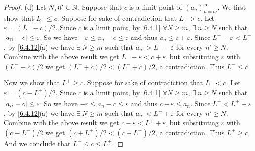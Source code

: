 \begin{proof}{(d)}
  Let \(N, n' \in \mathbb{N}\).
  Suppose that \(c\) is a limit point of \((a_n)_{n = m}^\infty\).
  We first show that \(L^- \leq c\).
  Suppose for sake of contradiction that \(L^- > c\).
  Let \(\varepsilon = (L^- - c) / 2\).
  Since \(c\) is a limit point, by \cref{6.4.1} \(\forall N \geq m\), \(\exists\ n \geq N\) such that \(\left\lvert a_n - c\right\rvert \leq \varepsilon\).
  So we have \(-\varepsilon \leq a_n - c \leq \varepsilon\) and thus \(a_n \leq c + \varepsilon\).
  Since \(L^- - \varepsilon < L^-\), by \cref{6.4.12}(a) we have \(\exists\ N \geq m\) such that \(a_{n'} > L^- - \varepsilon\) for every \(n' \geq N\).
  Combine with the above result we get \(L^- - \varepsilon < c + \varepsilon\), but substituting \(\varepsilon\) with \((L^- - c) / 2\) we get \((L^- + c) / 2 < (L^- + c) / 2\), a contradiction.
  Thus \(L^- \leq c\).

  Now we show that \(L^+ \geq c\).
  Suppose for sake of contradiction that \(L^+ < c\).
  Let \(\varepsilon = (c - L^+) / 2\).
  Since \(c\) is a limit point, by \cref{6.4.1} \(\forall N \geq m\), \(\exists\ n \geq N\) such that \(\left\lvert a_n - c\right\rvert \leq \varepsilon\).
  So we have \(-\varepsilon \leq a_n - c \leq \varepsilon\) and thus \(c - \varepsilon \leq a_n\).
  Since \(L^+ < L^+ + \varepsilon\), by \cref{6.4.12}(a) we have \(\exists\ N \geq m\) such that \(a_{n'} < L^+ + \varepsilon\) for every \(n' \geq N\).
  Combine with the above result we get \(c - \varepsilon < L^+ + \varepsilon\), but substituting \(\varepsilon\) with \((c - L^+) / 2\) we get \((c + L^+) / 2 < (c + L^+) / 2\), a contradiction.
  Thus \(L^+ \geq c\).
  And we conclude that \(L^- \leq c \leq L^+\).
\end{proof}

